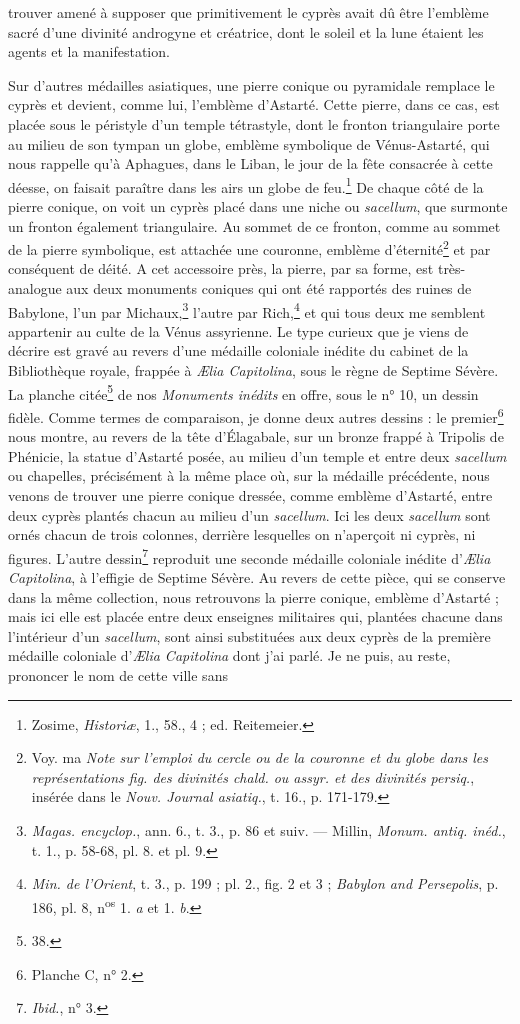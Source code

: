 \documentclass[a4paper, 11pt, oneside, polutonikogreek, french]{article}
\begin{document}
trouver amené à supposer que primitivement le cyprès avait dû être l'emblème sacré d'une divinité androgyne et créatrice, dont le soleil et la lune étaient les agents et la manifestation.

Sur d'autres médailles asiatiques, une pierre conique ou pyramidale remplace le cyprès et devient, comme lui, l'emblème d'Astarté. Cette pierre, dans ce cas, est placée sous le péristyle d'un temple tétrastyle, dont le fronton triangulaire porte au milieu de son tympan un globe, emblème symbolique de Vénus-Astarté, qui nous rappelle qu'à Aphagues, dans le Liban, le jour de la fête consacrée à cette déesse, on faisait paraître dans les airs un globe de feu.\footnote{Zosime, \emph{Historiæ}, 1., 58., 4 ; ed. Reitemeier.} De chaque côté de la pierre conique, on voit un cyprès placé dans une niche ou \emph{sacellum}, que surmonte un fronton également triangulaire. Au sommet de ce fronton, comme au sommet de la pierre symbolique, est attachée une couronne, emblème d'éternité\footnote{Voy. ma \emph{Note sur l'emploi du cercle ou de la couronne et du globe dans les représentations fig. des divinités chald. ou assyr. et des divinités persiq.}, insérée dans le \emph{Nouv. Journal asiatiq.}, t. 16., p. 171-179.} et par conséquent de déité. A cet accessoire près, la pierre, par sa forme, est très-analogue aux deux monuments coniques qui ont été rapportés des ruines de Babylone, l'un par Michaux,\footnote{\emph{Magas. encyclop.}, ann. 6., t. 3., p. 86 et suiv. --- Millin, \emph{Monum. antiq. inéd.}, t. 1., p. 58-68, pl. 8. et pl. 9.} l'autre par Rich,\footnote{\emph{Min. de l'Orient}, t. 3., p. 199 ; pl. 2., fig. 2 et 3 ; \emph{Babylon and Persepolis}, p. 186, pl. 8, n\textsuperscript{os} 1. \emph{a} et 1. \emph{b}.} et qui tous deux me semblent appartenir au culte de la Vénus assyrienne. Le type curieux que je viens de décrire est gravé au revers d'une médaille coloniale inédite du cabinet de la Bibliothèque royale, frappée à \emph{Ælia Capitolina}, sous le règne de Septime Sévère. La planche citée\footnote{38.} de nos \emph{Monuments inédits} en offre, sous le n° 10, un dessin fidèle. Comme termes de comparaison, je donne deux autres dessins : le premier\footnote{Planche C, n° 2.} nous montre, au revers de la tête d'Élagabale, sur un bronze frappé à Tripolis de Phénicie, la statue d'Astarté posée, au milieu d'un temple et entre deux \emph{sacellum} ou chapelles, précisément à la même place où, sur la médaille précédente, nous venons de trouver une pierre conique dressée, comme emblème d'Astarté, entre deux cyprès plantés chacun au milieu d'un \emph{sacellum}. Ici les deux \emph{sacellum} sont ornés chacun de trois colonnes, derrière lesquelles on n'aperçoit ni cyprès, ni figures. L'autre dessin\footnote{\emph{Ibid.}, n° 3.} reproduit une seconde médaille coloniale inédite d'\emph{Ælia Capitolina}, à l'effigie de Septime Sévère. Au revers de cette pièce, qui se conserve dans la même collection, nous retrouvons la pierre conique, emblème d'Astarté ; mais ici elle est placée entre deux enseignes militaires qui, plantées chacune dans l'intérieur d'un \emph{sacellum}, sont ainsi substituées aux deux cyprès de la première médaille coloniale d'\emph{Ælia Capitolina} dont j'ai parlé. Je ne puis, au reste, prononcer le nom de cette ville sans 
\end{document}
